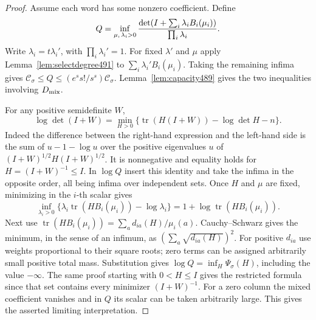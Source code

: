 \documentclass[a4paper,11pt]{article}
\theoremstyle{definition}
\theoremstyle{remark}
\numberwithin{equation}{section}
\begin{document}
\begin{proof}
Assume each word has some nonzero coefficient. Define
\[
 Q=\inf_{\mu,\,\lambda_i>0}
       {\det(I+\sum_i\lambda_i B_i(\mu_i))\over\prod_i\lambda_i}.
\]
Write \(\lambda_i=t\lambda_i'\), with \(\prod_i\lambda_i'=1\).
For fixed \(\lambda'\) and \(\mu\) apply
Lemma~\ref{lem:selectdegree491} to \(\sum_i\lambda_i'B_i(\mu_i)\).
Taking the remaining infima gives
\(\mathcal C_\sigma\le Q\le (e^s s!/s^s)\mathcal C_\sigma\).
Lemma~\ref{lem:capacity489} gives the two inequalities involving
\(D_{\rm mix}\).

For any positive semidefinite \(W\),
\[
  \log\det(I+W)=\min_{H>0}
       \{\operatorname{tr}(H(I+W))-\log\det H-n\}.
\]
Indeed the difference between the right-hand expression and the
left-hand side is the sum of \(u-1-\log u\) over the positive
eigenvalues \(u\) of \((I+W)^{1/2}H(I+W)^{1/2}\).
It is nonnegative and equality holds for \(H=(I+W)^{-1}\le I\).
In \(\log Q\) insert this identity and take the infima in the
opposite order, all being infima over independent sets. Once \(H\)
and \(\mu\) are fixed, minimizing in the \(i\)-th scalar gives
\[
 \inf_{\lambda_i>0}
       \{\lambda_i\operatorname{tr}(HB_i(\mu_i))-\log\lambda_i\}
                          =1+\log\operatorname{tr}(HB_i(\mu_i)).
\]
Next use \(\operatorname{tr}(HB_i(\mu_i))=\sum_a d_{ia}(H)/\mu_i(a)\).
Cauchy--Schwarz gives the minimum, in the sense of an infimum,
as \((\sum_a\sqrt{d_{ia}(H)})^2\). For positive \(d_{ia}\)
use weights proportional to their square roots; zero terms
can be assigned arbitrarily small positive total mass.
Substitution gives \(\log Q=\inf_H\Psi_\sigma(H)\), including
the value \(-\infty\). The same proof starting with \(0<H\le I\)
gives the restricted formula since that set contains every
minimizer \((I+W)^{-1}\). For a zero column the mixed coefficient
vanishes and in \(Q\) its scalar can be taken arbitrarily large.
This gives the asserted limiting interpretation.
\end{proof}
\end{document}
